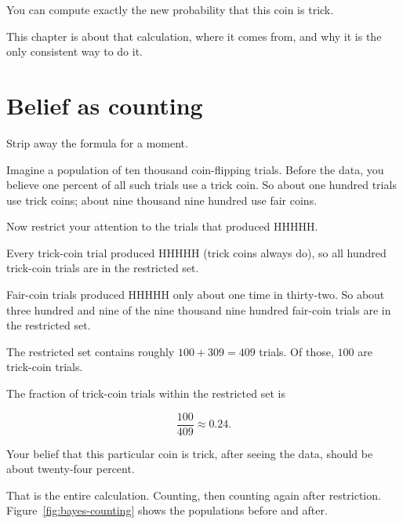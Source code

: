 You can compute exactly the new probability that this coin is trick.

This chapter is about that calculation, where it comes from, and why it is the only consistent way to do it.

\section*{Belief as counting}

Strip away the formula for a moment.

Imagine a population of ten thousand coin-flipping trials. Before the data, you believe one percent of all such trials use a trick coin. So about one hundred trials use trick coins; about nine thousand nine hundred use fair coins.

Now restrict your attention to the trials that produced HHHHH.

Every trick-coin trial produced HHHHH (trick coins always do), so all hundred trick-coin trials are in the restricted set.

Fair-coin trials produced HHHHH only about one time in thirty-two. So about three hundred and nine of the nine thousand nine hundred fair-coin trials are in the restricted set.

The restricted set contains roughly $100 + 309 = 409$ trials. Of those, $100$ are trick-coin trials.

The fraction of trick-coin trials within the restricted set is

$$\frac{100}{409} \approx 0.24.$$

Your belief that this particular coin is trick, after seeing the data, should be about twenty-four percent.

That is the entire calculation. Counting, then counting again after restriction. Figure~\ref{fig:bayes-counting} shows the populations before and after.

